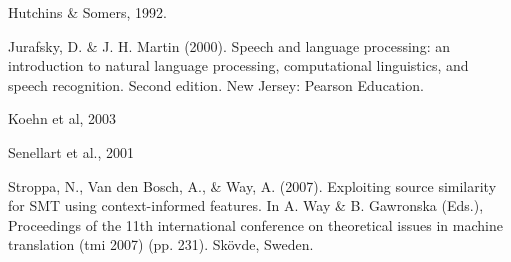 \documentclass[12pt]{article}
\begin{document}
\begin{thebibliography}{99}
Hutchins \& Somers, 1992.

Jurafsky, D. \& J. H. Martin (2000). Speech and language processing: an introduction to natural language processing, computational linguistics, and speech recognition. Second edition. New Jersey: Pearson Education.

Koehn et al, 2003

Senellart et al., 2001

Stroppa, N., Van den Bosch, A., \& Way, A. (2007). Exploiting source similarity for SMT
using context-informed features. In A. Way \& B. Gawronska (Eds.), Proceedings of the
11th international conference on theoretical issues in machine translation (tmi 2007)
(pp. 231). Skövde, Sweden.

\end{thebibliography}
\end{document}

